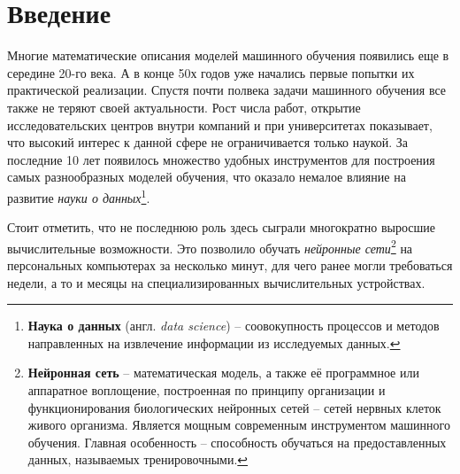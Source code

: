 \documentclass[11pt,a4paper]{extarticle}
\begin{document}
\begin{abstract}
	The algorithm of changing the time of the day on images is a subclass of Machine Learning problems of image translation.
	Image-2-image translation is one of the of computer vision problems, where the goal is to extract style features from image (or set of images) with subsequent applying the pt-model to the base image to generate new images with specified styles while preserving semantic information.
	This area has advanced significantly due to the modern computing capabilities, in particular the training transfer on GPUs.
	Over the past few years, many research papers have appeared on the subjects of crossdomain images translation, styles transfering and colorization.
	This research reveals modern approaches of image translation applicable to problem of changing the time of day on the image.
	A description of the neural network models, the rationale and choice of method for training, and a comparative quality analysis of a series of training experiments are carried out.
	The model and translation results can be applied to augment data in related machine learning problems.
\end{abstract}

\newpage
\tableofcontents
\newpage

\section{Введение}

	Многие математические описания моделей машинного обучения появились еще в середине 20-го века.
	А в конце 50х годов уже начались первые попытки их практической реализации.
	Спустя почти полвека задачи машинного обучения все также не теряют своей актуальности.
	Рост числа работ, открытие исследовательских центров внутри компаний и при университетах показывает,
	что высокий интерес к данной сфере не ограничивается только наукой.
	За последние 10 лет появилось множество удобных инструментов для построения самых разнообразных моделей обучения, что оказало немалое влияние на развитие \textit{науки о данных}\footnote{
		\textbf{Наука о данных} (англ. \textit{data science}) -- соовокупность процессов и методов направленных на извлечение информации из исследуемых данных.
	}.  
	
	Стоит отметить, что не последнюю роль здесь сыграли многократно выросшие вычислительные возможности. 
	Это позволило обучать \textit{нейронные сети}\footnote{
		\textbf{Нейронная сеть} --  математическая модель, а также её программное или аппаратное воплощение, 
		построенная по принципу организации и функционирования биологических нейронных сетей -- сетей нервных клеток живого организма.
		Является мощным современным инструментом машинного обучения.
		Главная особенность -- способность обучаться на предоставленных данных, называемых тренировочными.
	} на персональных компьютерах за несколько минут, для чего ранее могли требоваться недели, а то и месяцы на специализированных вычислительных устройствах.
\end{document}
